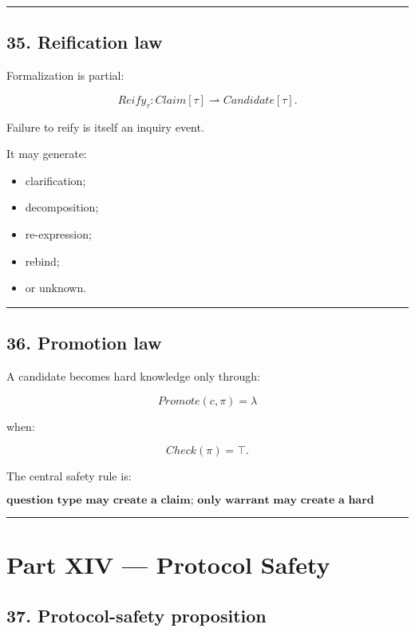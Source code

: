 \documentclass[
]{article}
\providecommand{\tightlist}{%
  \setlength{\itemsep}{0pt}\setlength{\parskip}{0pt}}
\begin{document}
\begin{center}\rule{0.5\linewidth}{0.5pt}\end{center}

\subsection{35. Reification law}\label{reification-law}

Formalization is partial:

\[
\boxed{
Reify_\tau
:
Claim[\tau]
\rightharpoonup
Candidate[\tau].
}
\]

Failure to reify is itself an inquiry event.

It may generate:

\begin{itemize}
\tightlist
\item
  clarification;
\item
  decomposition;
\item
  re-expression;
\item
  rebind;
\item
  or unknown.
\end{itemize}

\begin{center}\rule{0.5\linewidth}{0.5pt}\end{center}

\subsection{36. Promotion law}\label{promotion-law}

A candidate becomes hard knowledge only through:

\[
\boxed{
Promote(c,\pi)
=
\lambda
}
\]

when:

\[
Check(\pi)=\top.
\]

The central safety rule is:

\[
\boxed{
\textbf{question type may create a claim;
only warrant may create a hard lemma.}
}
\]

\begin{center}\rule{0.5\linewidth}{0.5pt}\end{center}

\section{Part XIV --- Protocol Safety}\label{part-xiv-protocol-safety}

\subsection{37. Protocol-safety
proposition}\label{protocol-safety-proposition}
\end{document}

